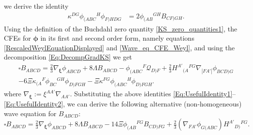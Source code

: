 \documentclass[10pt,a4paper]{article}
\theoremstyle{plain}
\newcounter{mnotecount}%
\newcommand{\mnotex}[1]%
{\protect{\stepcounter{mnotecount}}$^{\mbox{\footnotesize $\bullet$\themnotecount}}$ 
\marginpar{%
\raggedright\tiny\em
$\!\!\!\!\!\!\,\bullet$\themnotecount: #1} }
\begin{document}
we derive the identity
\begin{align}
     \kappa^{DG}\phi_{(ABC}{}^H\phi_{F)HDG}&=2\phi_{(AB}{}^{GH}B_{CF)GH}. \label{Eq:UsefulIdentity2}
\end{align}
Using the definition of the Buchdahl zero quantity
\eqref{KS_zero_quantities1}, the CFEs for $\bm\phi$
in its first and second order form, namely equations
\eqref{RescaledWeylEquationDisplayed} and \eqref{Wave_eq_CFE_Weyl},
and using the decomposition \eqref{Eq:DecompGradKS} we get
\begin{multline} 
\square B_{ABCD} = \tfrac{2}{3}  \nabla_{\bm\xi}\phi_{ABCD} + 8 \Lambda B_{ABCD} -   \phi_{(ABC}{}^{F}\mathcal{Q}_{D)F} + \tfrac{2}{3} H^{A'}{}_{(A}{}^{FG}\nabla_{|FA'|}\phi_{BCD)G} \\ - 6 \Xi \kappa_{(A}{}^{F}\phi_{BC}{}^{GH}\phi_{D)FGH} -  \Xi \kappa^{FG}\phi_{(ABC}{}^{H}\phi_{D)FGH}.
\end{multline}
where $\nabla_{\bm\xi} := \xi^{AA'}\nabla_{AA'}$. Substituting the above identities
\eqref{Eq:UsefulIdentity1}--\eqref{Eq:UsefulIdentity2}, we can derive
the following alternative (non-homogeneous) wave equation for
$B_{ABCD}$:
\begin{equation}
    \square B_{ABCD} = \tfrac{2}{3}\nabla_{\bm\xi}\phi_{ABCD} +
    8\Lambda B_{ABCD} - 14\Xi \phi_{(AB}{}^{FG}B_{CD)FG} +
    \tfrac{2}{3}(\nabla_{FA'}\phi_{G(ABC})H^{A'}{}_{D)}{}^{FG}. \label{Eq:SecondWaveEqForB}
\end{equation}
\end{document}
